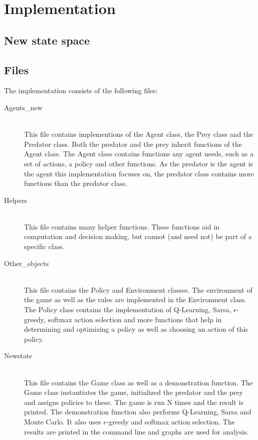 \documentclass{article}
\begin{document}
\section{Implementation}

\subsection{New state space}


\subsection{Files}

The implementation consists of the following files:
\begin{description}
	\item[Agents\_new] \hfill \\ 
	This file contains implementions of the Agent class, the Prey class and the Predator class. Both the predator and the prey inherit functions of the Agent class. The Agent class contains functions any agent needs, such as a set of actions, a policy and other functions. As the predator is the agent is the agent this implementation focuses on, the predator class contains more functions than the predator class.
	
	\item[Helpers] \hfill \\ 
	This file contains many helper functions. These functions aid in computation and decision making, but cannot (and need not) be part of a specific class.
	
	\item[Other\_objects] \hfill \\ %
	This file contains the Policy and Environment classes. The environment of the game as well as the rules are implemented in the Environment class. The Policy class contains the implementation of Q-Learning, Sarsa, $\epsilon$-greedy, softmax action selection and more functions that help in determining and optimizing a policy as well as choosing an action of this policy.
	\item[Newstate] \hfill \\ 
	This file contains the Game class as well as a demonstration function. The Game class instantiates the game, initialized the predator and the prey and assigns policies to these. The game is run N times and the result is printed. The demonstration function also performs Q-Learning, Sarsa and Monte Carlo. It also uses $\epsilon$-greedy and softmax action selection. The results are printed in the command line and graphs are used for analysis.
\end{description}
\end{document}
